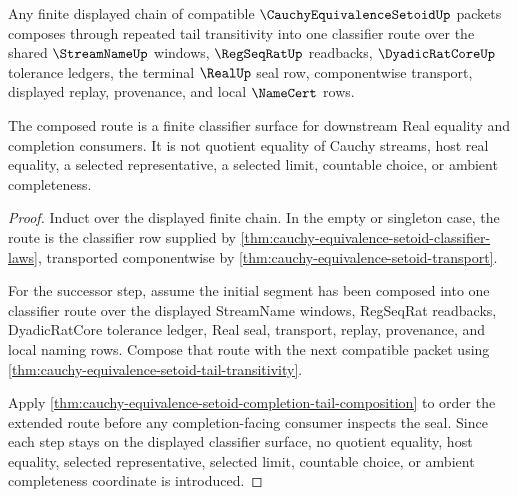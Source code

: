 \begin{theorem}
\label{thm:cauchy-equivalence-setoid-finite-chain-composition}
Any finite displayed chain of compatible $\CauchyEquivalenceSetoidUp$ packets composes through repeated tail transitivity into one classifier route over the shared $\StreamNameUp$ windows, $\RegSeqRatUp$ readbacks, $\DyadicRatCoreUp$ tolerance ledgers, the terminal $\RealUp$ seal row, componentwise transport, displayed replay, provenance, and local $\NameCert$ rows.

The composed route is a finite classifier surface for downstream Real equality and completion consumers. It is not quotient equality of Cauchy streams, host real equality, a selected representative, a selected limit, countable choice, or ambient completeness.
\end{theorem}
\begin{proof}
Induct over the displayed finite chain. In the empty or singleton case, the route is the classifier row supplied by \autoref{thm:cauchy-equivalence-setoid-classifier-laws}, transported componentwise by \autoref{thm:cauchy-equivalence-setoid-transport}.

For the successor step, assume the initial segment has been composed into one classifier route over the displayed StreamName windows, RegSeqRat readbacks, DyadicRatCore tolerance ledger, Real seal, transport, replay, provenance, and local naming rows. Compose that route with the next compatible packet using \autoref{thm:cauchy-equivalence-setoid-tail-transitivity}.

Apply \autoref{thm:cauchy-equivalence-setoid-completion-tail-composition} to order the extended route before any completion-facing consumer inspects the seal. Since each step stays on the displayed classifier surface, no quotient equality, host equality, selected representative, selected limit, countable choice, or ambient completeness coordinate is introduced.
\end{proof}

